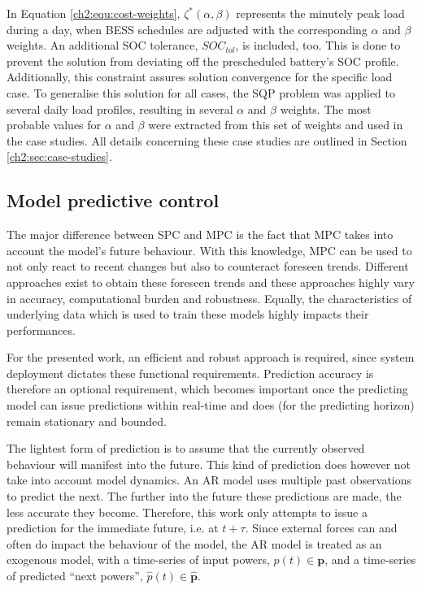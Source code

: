 

In Equation \ref{ch2:equ:cost-weights}, $\zeta^*(\alpha, \beta)$ represents the minutely peak load during a day, when BESS schedules are adjusted with the corresponding $\alpha$ and $\beta$ weights.
An additional SOC tolerance, $SOC_{tol}$, is included, too.
This is done to prevent the solution from deviating off the prescheduled battery's SOC profile.
Additionally, this constraint assures solution convergence for the specific load case.
To generalise this solution for all cases, the SQP problem was applied to several daily load profiles, resulting in several $\alpha$ and $\beta$ weights.
The most probable values for $\alpha$ and $\beta$ were extracted from this set of weights and used in the case studies.
All details concerning these case studies are outlined in Section \ref{ch2:sec:case-studies}.

\subsection{Model predictive control}

The major difference between SPC and MPC is the fact that MPC takes into account the model's future behaviour.
With this knowledge, MPC can be used to not only react to recent changes but also to counteract foreseen trends.
Different approaches exist to obtain these foreseen trends and these approaches highly vary in accuracy, computational burden and robustness.
Equally, the characteristics of underlying data which is used to train these models highly impacts their performances.

For the presented work, an efficient and robust approach is required, since system deployment dictates these functional requirements.
Prediction accuracy is therefore an optional requirement, which becomes important once the predicting model can issue predictions within real-time and does (for the predicting horizon) remain stationary and bounded.

The lightest form of prediction is to assume that the currently observed behaviour will manifest into the future.
This kind of prediction does however not take into account model dynamics.
An AR model uses multiple past observations to predict the next.
The further into the future these predictions are made, the less accurate they become.
Therefore, this work only attempts to issue a prediction for the immediate future, i.e. at $t+\tau$.
Since external forces can and often do impact the behaviour of the model, the AR model is treated as an exogenous model, with a time-series of input powers, $p(t) \in \textbf{p}$, and a time-series of predicted ``next powers'', $\hat{p}(t) \in \hat{\textbf{p}}$.

